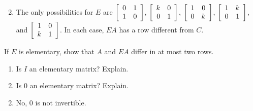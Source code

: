 \begin{multicols}{2}
\begin{ex}
\begin{enumerate}[label={\alph*.}]
\end{enumerate}
\begin{sol}
\begin{enumerate}[label={\alph*.}]
\setcounter{enumi}{1}
\item The only possibilities for $E$ are $\left[ \begin{array}{rr}
0 & 1 \\
1 & 0
\end{array} \right]$, $ 
\left[ \begin{array}{rr}
k & 0 \\
0 & 1
\end{array} \right]$, $ 
\left[ \begin{array}{rr}
1 & 0 \\
0 & k
\end{array} \right]$, $ 
\left[ \begin{array}{rr}
1 & k \\
0 & 1
\end{array} \right]$, and $\left[ \begin{array}{rr}
 1 & 0 \\
 k & 1
 \end{array} \right]$. In each case, $EA$ has a row different from $C$.

\end{enumerate}
\end{sol}
\end{ex}

\begin{ex}
If $E$ is elementary, show that $A$ and $EA$ differ in at most two rows.
\end{ex}

\begin{ex}
\begin{enumerate}[label={\alph*.}]
\item Is $I$ an elementary matrix? Explain.

\item Is $0$ an elementary matrix? Explain.

\end{enumerate}
\begin{sol}
\begin{enumerate}[label={\alph*.}]
\setcounter{enumi}{1}
\item  No, $0$ is not invertible.

\end{enumerate}
\end{sol}
\end{ex}


\end{multicols}
